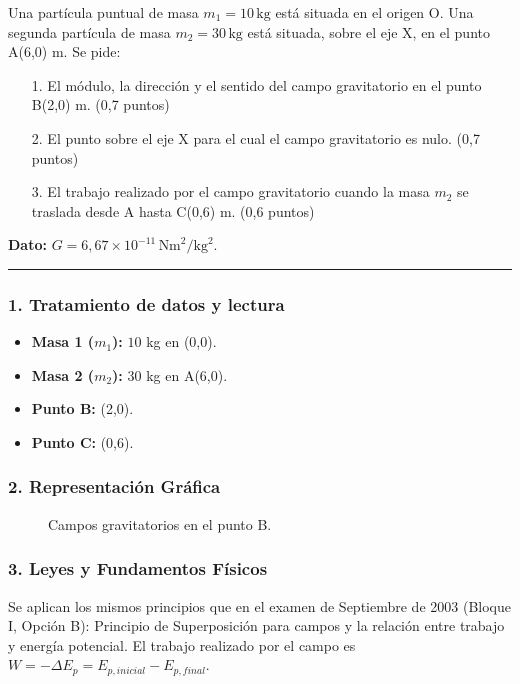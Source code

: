 \begin{cajaenunciado}
Una partícula puntual de masa $m_1=10\,\text{kg}$ está situada en el origen O. Una segunda partícula de masa $m_2=30\,\text{kg}$ está situada, sobre el eje X, en el punto A(6,0) m. Se pide:
\begin{enumerate}
    \item[1.] El módulo, la dirección y el sentido del campo gravitatorio en el punto B(2,0) m. (0,7 puntos)
    \item[2.] El punto sobre el eje X para el cual el campo gravitatorio es nulo. (0,7 puntos)
    \item[3.] El trabajo realizado por el campo gravitatorio cuando la masa $m_2$ se traslada desde A hasta C(0,6) m. (0,6 puntos)
\end{enumerate}
\textbf{Dato:} $G=6,67\times10^{-11}\,\text{Nm}^2/\text{kg}^2$.
\end{cajaenunciado}
\hrule

\subsubsection*{1. Tratamiento de datos y lectura}
\begin{itemize}
    \item \textbf{Masa 1 ($m_1$):} $10$ kg en (0,0).
    \item \textbf{Masa 2 ($m_2$):} $30$ kg en A(6,0).
    \item \textbf{Punto B:} (2,0).
    \item \textbf{Punto C:} (0,6).
\end{itemize}

\subsubsection*{2. Representación Gráfica}
\begin{figure}[H]
    \centering
    \caption{Campos gravitatorios en el punto B.}
\end{figure}

\subsubsection*{3. Leyes y Fundamentos Físicos}
Se aplican los mismos principios que en el examen de Septiembre de 2003 (Bloque I, Opción B): Principio de Superposición para campos y la relación entre trabajo y energía potencial. El trabajo realizado por el campo es $W = - \Delta E_p = E_{p,inicial} - E_{p,final}$.

